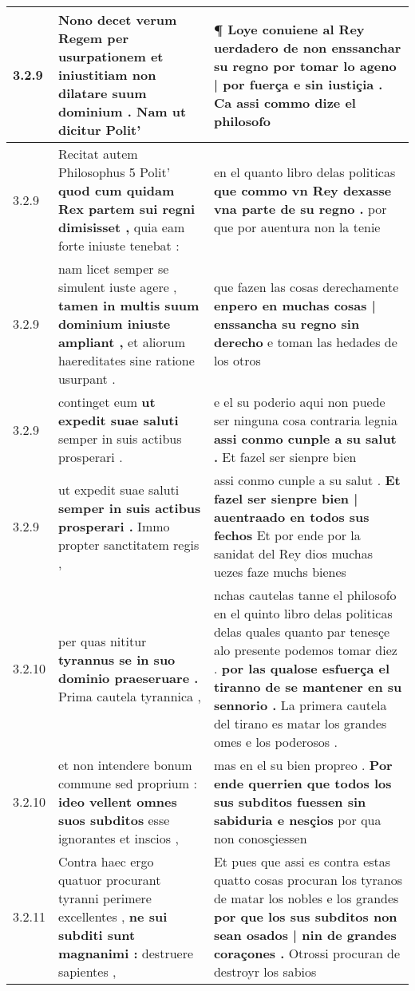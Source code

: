 \begin{tabular}{|p{1cm}|p{6.5cm}|p{6.5cm}|}
3.2.9 & Nono decet verum Regem per usurpationem et iniustitiam \textbf{ non dilatare suum dominium . } Nam ut dicitur Polit’ & ¶ Loye conuiene al Rey uerdadero de non enssanchar su regno \textbf{ por tomar lo ageno | por fuerça e sin iustiçia . } Ca assi commo dize el philosofo \\\hline
3.2.9 & Recitat autem Philosophus 5 Polit’ \textbf{ quod cum quidam Rex partem sui regni dimisisset , } quia eam forte iniuste tenebat : & en el quanto libro delas politicas \textbf{ que commo vn Rey dexasse vna parte de su regno . } por que por auentura non la tenie \\\hline
3.2.9 & nam licet semper se simulent iuste agere , \textbf{ tamen in multis suum dominium iniuste ampliant , } et aliorum haereditates sine ratione usurpant . & que fazen las cosas derechamente \textbf{ enpero en muchas cosas | enssancha su regno sin derecho } e toman las hedades de los otros \\\hline
3.2.9 & continget eum \textbf{ ut expedit suae saluti } semper in suis actibus prosperari . & e el su poderio aqui non puede ser ninguna cosa contraria legnia \textbf{ assi conmo cunple a su salut . } Et fazel ser sienpre bien \\\hline
3.2.9 & ut expedit suae saluti \textbf{ semper in suis actibus prosperari . } Immo propter sanctitatem regis , & assi conmo cunple a su salut . \textbf{ Et fazel ser sienpre bien | auentraado en todos sus fechos } Et por ende por la sanidat del Rey dios muchas uezes faze muchs bienes \\\hline
3.2.10 & per quas nititur \textbf{ tyrannus se in suo dominio praeseruare . } Prima cautela tyrannica , & nchas cautelas tanne el philosofo en el quinto libro delas politicas delas quales quanto par tenesçe alo presente podemos tomar diez . \textbf{ por las qualose esfuerça el tiranno de se mantener en su sennorio . } La primera cautela del tirano es matar los grandes omes e los poderosos . \\\hline
3.2.10 & et non intendere bonum commune sed proprium : \textbf{ ideo vellent omnes suos subditos } esse ignorantes et inscios , & mas en el su bien propreo . \textbf{ Por ende querrien que todos los sus subditos fuessen sin sabiduria e nesçios } por qua non conosçiessen \\\hline
3.2.11 & Contra haec ergo quatuor procurant tyranni perimere excellentes , \textbf{ ne sui subditi sunt magnanimi : } destruere sapientes , & Et pues que assi es contra estas quatto cosas procuran los tyranos de matar los nobles e los grandes \textbf{ por que los sus subditos non sean osados | nin de grandes coraçones . } Otrossi procuran de destroyr los sabios \\\hline

\end{tabular}
